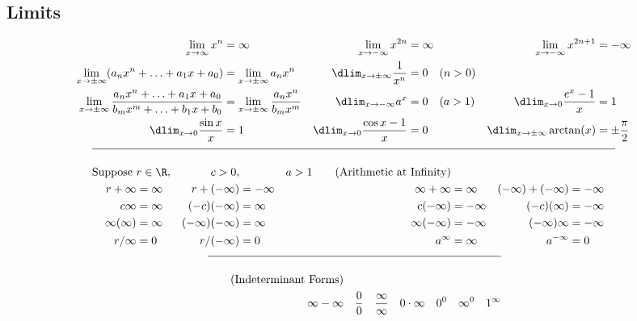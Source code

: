 \documentclass{book}
\begin{document}
\begin{appendices}
\section*{Limits}
\begin{align*}
\lim_{x\to \infty} x^n &= \infty & \lim_{x\to -\infty} x^{2n} &=\infty & \lim_{x\to -\infty} x^{2n+1} &=-\infty\\
\lim_{x\to \pm\infty} (a_nx^n + \ldots + a_1x + a_0) &= \lim_{x\to \pm\infty} a_nx^n &\dlim_{x\to \pm\infty} \dfrac{1}{x^n} &= 0\quad (n>0)\\
\lim_{x\to \pm\infty} \dfrac{a_nx^n + \ldots + a_1x + a_0}{b_mx^m+\ldots + b_1x+b_0} &= \lim_{x\to \pm\infty} \dfrac{a_nx^n}{b_mx^m} & \dlim_{x\to -\infty} a^x &= 0\quad (a>1) &\dlim_{x\to 0} \dfrac{e^x-1}{x} &= 1\\
\dlim_{x\to 0} \dfrac{\sin x}{x} &= 1 & \dlim_{x\to 0} \dfrac{\cos x -1}{x} &= 0 &\dlim_{x\to \pm\infty} \arctan(x) &= \pm\dfrac{\pi}{2}
\end{align*}
\begin{align}\hline\nonumber\\\text{Suppose}\ & r\in \R,  & c>0,  &&a>1 \tag{Arithmetic at Infinity}\\
\nonumber r+\infty &= \infty  &  r+(-\infty) &= -\infty  &  \infty + \infty &= \infty & (-\infty) + (-\infty) &= -\infty\\
\nonumber c\infty &= \infty & (-c)(-\infty) &= \infty & c(-\infty) &= -\infty & (-c)(\infty) &= -\infty \\
\nonumber \infty(\infty) &=  \infty & (-\infty)(-\infty) &=  \infty & \infty(-\infty) &=  -\infty & (-\infty)\infty &=  -\infty\\
\nonumber r/\infty &= 0 &  r/(-\infty)  &= 0 & a^\infty &= \infty& a^{-\infty} &= 0 
 \end{align}
 \begin{align}\hline\nonumber\\\tag{Indeterminant Forms}\\
\nonumber \infty-\infty && \dfrac{0}{0} && \dfrac{\infty}{\infty} && 0\cdot \infty && 0^0 && \infty^0 && 1^\infty
\end{align}
\pagebreak


\end{appendices}
\end{document}
